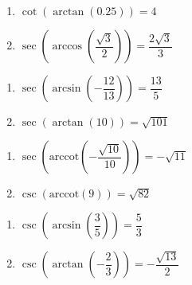 \begin{multicols}{2}

\begin{enumerate}

\setcounter{enumi}{\value{HW}}

\item  $\cot\left(\arctan \left( 0.25 \right)\right) = 4$ 
\item  $\sec\left(\arccos\left(\dfrac{\sqrt{3}}{2}\right)\right) = \dfrac{2\sqrt{3}}{3}$

\setcounter{HW}{\value{enumi}}

\end{enumerate}

\end{multicols}

\begin{multicols}{2}

\begin{enumerate}

\setcounter{enumi}{\value{HW}}

\item  $\sec\left(\arcsin\left(-\dfrac{12}{13}\right)\right) = \dfrac{13}{5}$
\item  $\sec\left(\arctan\left(10\right)\right) = \sqrt{101}$ 

\setcounter{HW}{\value{enumi}}

\end{enumerate}

\end{multicols}

\begin{multicols}{2}

\begin{enumerate}

\setcounter{enumi}{\value{HW}}

\item  $\sec\left(\text{arccot}\left(-\dfrac{\sqrt{10}}{10}\right)\right) = -\sqrt{11}$
\item  $\csc\left(\text{arccot}\left(9 \right)\right) = \sqrt{82}$ 

\setcounter{HW}{\value{enumi}}

\end{enumerate}

\end{multicols}

\begin{multicols}{2}

\begin{enumerate}

\setcounter{enumi}{\value{HW}}

\item  $\csc\left(\arcsin\left(\dfrac{3}{5}\right)\right) = \dfrac{5}{3}$
\item  $\csc\left(\arctan\left(-\dfrac{2}{3}\right)\right) = -\dfrac{\sqrt{13}}{2}$

\setcounter{HW}{\value{enumi}}

\end{enumerate}

\end{multicols}

